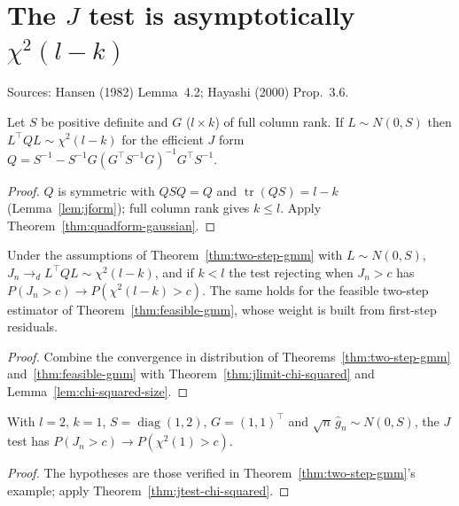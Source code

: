 \section{The \texorpdfstring{$J$}{J} test is asymptotically \texorpdfstring{$\chi^2(l-k)$}{chi-squared(l-k)}}
\label{sec:jtest-chi-squared}

Sources: Hansen (1982) Lemma~4.2; Hayashi (2000) Prop.~3.6.

\begin{theorem}
\label{thm:jlimit-chi-squared}
\leanok
{}
Let $S$ be positive definite and $G$ ($l\times k$) of full column rank. If $L\sim N(0,S)$ then $L^\top QL\sim\chi^2(l-k)$
for the efficient $J$ form $Q = S^{-1}-S^{-1}G(G^\top S^{-1}G)^{-1}G^\top S^{-1}$.
\end{theorem}
\begin{proof}
\leanok
$Q$ is symmetric with $QSQ = Q$ and $\operatorname{tr}(QS) = l-k$ (Lemma~\ref{lem:jform}); full column rank gives
$k\le l$. Apply Theorem~\ref{thm:quadform-gaussian}.
\end{proof}

\begin{theorem}
\label{thm:jtest-chi-squared}
\leanok
{}
Under the assumptions of Theorem~\ref{thm:two-step-gmm} with $L\sim N(0,S)$, $J_n\to_d L^\top QL\sim\chi^2(l-k)$, and if
$k<l$ the test rejecting when $J_n > c$ has $P(J_n > c)\to P(\chi^2(l-k) > c)$. The same holds for the feasible
two-step estimator of Theorem~\ref{thm:feasible-gmm}, whose weight is built from first-step residuals.
\end{theorem}
\begin{proof}
\leanok
Combine the convergence in distribution of Theorems~\ref{thm:two-step-gmm} and~\ref{thm:feasible-gmm} with
Theorem~\ref{thm:jlimit-chi-squared} and Lemma~\ref{lem:chi-squared-size}.
\end{proof}

\begin{theorem}
\label{thm:jtest-chi-squared-witness}
\leanok
{}
With $l = 2$, $k = 1$, $S = \operatorname{diag}(1,2)$, $G = (1,1)^\top$ and $\sqrt n\,\hat g_n\sim N(0,S)$, the $J$ test
has $P(J_n > c)\to P(\chi^2(1) > c)$.
\end{theorem}
\begin{proof}
\leanok
The hypotheses are those verified in Theorem~\ref{thm:two-step-gmm}'s example; apply Theorem~\ref{thm:jtest-chi-squared}.
\end{proof}

